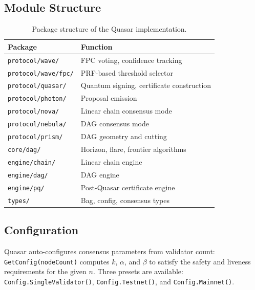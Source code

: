 \subsection{Module Structure}

\begin{table}[ht]
\centering
\small
\begin{tabular}{@{}ll@{}}
\toprule
\textbf{Package} & \textbf{Function} \\
\midrule
\texttt{protocol/wave/}   & FPC voting, confidence tracking \\
\texttt{protocol/wave/fpc/} & PRF-based threshold selector \\
\texttt{protocol/quasar/} & Quantum signing, certificate construction \\
\texttt{protocol/photon/} & Proposal emission \\
\texttt{protocol/nova/}   & Linear chain consensus mode \\
\texttt{protocol/nebula/} & DAG consensus mode \\
\texttt{protocol/prism/}  & DAG geometry and cutting \\
\texttt{core/dag/}        & Horizon, flare, frontier algorithms \\
\texttt{engine/chain/}    & Linear chain engine \\
\texttt{engine/dag/}      & DAG engine \\
\texttt{engine/pq/}       & Post-Quasar certificate engine \\
\texttt{types/}           & Bag, config, consensus types \\
\bottomrule
\end{tabular}
\caption{Package structure of the Quasar implementation.}
\label{tab:packages}
\end{table}

\subsection{Configuration}

Quasar auto-configures consensus parameters from validator count:
\texttt{GetConfig(nodeCount)} computes $k$, $\alpha$, and $\beta$ to
satisfy the safety and liveness requirements for the given $n$. Three
presets are available: \texttt{Config.SingleValidator()},
\texttt{Config.Testnet()}, and \texttt{Config.Mainnet()}.


